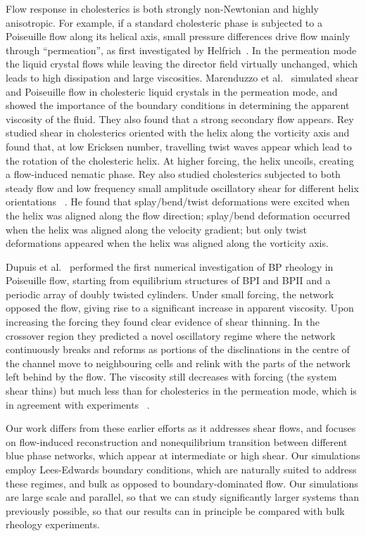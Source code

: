 \documentclass[aps,pre,reprint,superscriptaddress, twocolumn]{revtex4}
\begin{document}
Flow response in cholesterics is both strongly non-Newtonian and highly anisotropic.
For example, if a standard cholesteric phase is subjected to a Poiseuille flow along
its helical axis, small pressure differences drive flow mainly through
``permeation'', as first investigated by Helfrich~\cite{Helfrich:1969}.
In the permeation mode the liquid crystal flows while leaving the director
field virtually unchanged, which leads to high dissipation and large
viscosities. Marenduzzo et al.~\cite{Marenduzzo:2006a,Marenduzzo:2006b} simulated 
shear and Poiseuille flow in cholesteric liquid crystals in the permeation mode, and 
showed the importance of the boundary conditions in determining the apparent viscosity of the fluid. 
They also found that a strong secondary flow appears.
Rey~\cite{Rey:1996a, Rey:1996b} studied shear in cholesterics oriented with the helix along 
the vorticity axis and found that, at low Ericksen number, travelling twist waves appear which 
lead to the rotation of the cholesteric helix. At higher forcing, the helix uncoils, creating a flow-induced nematic phase.
Rey also studied cholesterics subjected to both steady flow and low frequency
small amplitude oscillatory shear for different helix orientations
~\cite{Rey:2000, Rey:2002}. He found that splay/bend/twist deformations were
excited when the helix was aligned along the flow direction; splay/bend
deformation occurred when the helix was aligned along the velocity gradient;
but only twist deformations
appeared when the helix was aligned along the vorticity axis.

Dupuis et al.~\cite{Dupuis:2005} performed the first numerical investigation of BP rheology 
in Poiseuille flow, starting from equilibrium structures of BPI and BPII and a periodic 
array of doubly twisted cylinders.
Under small forcing, the network opposed the flow, giving rise to a significant 
increase in apparent viscosity.
Upon increasing the forcing they found clear evidence of shear thinning.
In the crossover region they predicted a novel oscillatory regime where the network 
continuously breaks and reforms as portions of the disclinations in the centre of the channel 
move to neighbouring cells and relink with the parts of the network left behind by the flow. 
The viscosity still decreases with forcing 
(the system shear thins) but much less than
for cholesterics in the permeation mode, which is in agreement with experiments
~\cite{Zapotocky:1999, Ramos:2002}.

Our work differs from these earlier efforts as it addresses shear flows, 
and focuses on flow-induced reconstruction and nonequilibrium transition
between different blue phase networks, which appear at intermediate or
high shear. Our simulations employ Lees-Edwards boundary conditions, which
are naturally suited to address these regimes, and bulk as opposed
to boundary-dominated flow. 
Our simulations are large scale and parallel, so that we can study
significantly larger systems than previously possible, so that our
results can in principle be compared with bulk rheology experiments. 
\end{document}
